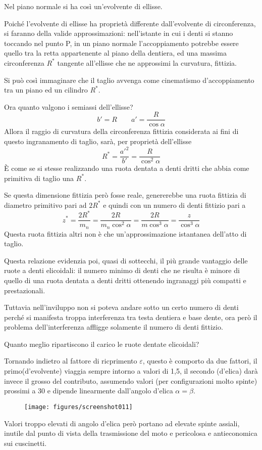 \documentclass[a4paper, 15pt]{article}
\begin{document}
\begin{adjustwidth}{2in}{}
Nel piano normale si ha così un'evolvente di ellisse.

Poiché l'evolvente di ellisse ha proprietà differente dall'evolvente di circonferenza, si faranno della valide approssimazioni: nell'istante in cui i denti si stanno toccando nel punto P, in un piano normale l'accoppiamento potrebbe essere quello tra la retta appartenente al piano  della dentiera, ed una massima circonferenza $R^*$ tangente all'ellisse che ne approssimi la curvatura, fittizia. 

Si può così immaginare che il taglio avvenga come cinematismo d'accoppiamento tra un piano ed un cilindro $R^*$. \newline 

Ora quanto valgono i semiassi dell'ellisse? 
\[b'= R \qquad a'= \dfrac{R}{\cos\alpha}\]
Allora il raggio di curvatura della circonferenza fittizia considerata ai fini di questo ingranamento di taglio, sarà, per proprietà dell'ellisse
\[R^* = \dfrac{a'^2}{b'} = \dfrac{R}{\cos^2\alpha}\]
È come se si stesse realizzando una ruota dentata a denti dritti che abbia come primitiva di taglio una $R^*$. \newline 

Se questa dimensione fittizia però fosse reale, genererebbe una ruota fittizia di diametro primitivo pari ad $2R^*$ e quindi con un numero di denti fittizio pari a 
\[z^* = \dfrac{2R^*}{m_n} = \dfrac{2R}{m_n\cos^2\alpha} = \dfrac{2R}{m\cos^3\alpha} = \dfrac{z}{\cos^3\alpha} \]
Questa ruota fittizia altri non è che un'approssimazione istantanea dell'atto di taglio. 

Questa relazione evidenzia poi, quasi di sottecchi, il più grande vantaggio delle ruote a denti elicoidali: il numero minimo di denti che ne risulta è minore di quello di una ruota dentata a denti dritti ottenendo ingranaggi più compatti e prestazionali.

Tuttavia nell'inviluppo non si poteva andare sotto un certo numero di denti perché si manifesta troppa interferenza tra testa dentiera e base dente, ora però il problema dell'interferenza affligge solamente il numero di denti fittizio.\newline 

Quanto meglio ripartiscono il carico le ruote dentate elicoidali? 

Tornando indietro al fattore di ricprimento $\varepsilon$, questo è comporto da due fattori, il primo(d'evolvente) viaggia sempre intorno a valori di 1,5, il secondo (d'elica) darà invece il grosso del contributo, assumendo valori (per configurazioni molto spinte) prossimi a 30 e dipende linearmente dall'angolo d'elica $\alpha=\beta$.
\begin{figure}[H]
	\centering
	\texttt{[image: figures/screenshot011]}
	\label{fig:screenshot011}
\end{figure}
Valori troppo elevati di angolo d'elica però portano ad elevate spinte assiali, inutile dal punto di vista della trasmissione del moto e pericolosa e antieconomica sui cuscinetti.  
\end{adjustwidth}
\end{document}
